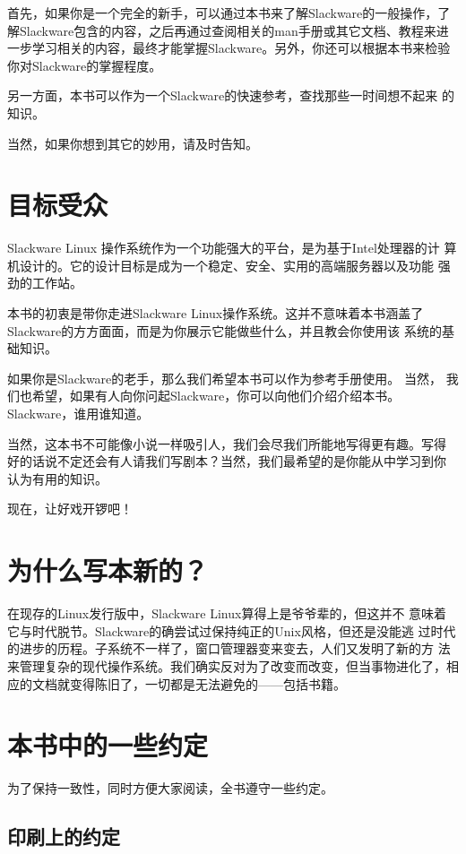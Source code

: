 首先，如果你是一个完全的新手，可以通过本书来了解Slackware的一般操作，了
解Slackware包含的内容，之后再通过查阅相关的man手册或其它文档、教程来进
一步学习相关的内容，最终才能掌握Slackware。另外，你还可以根据本书来检验
你对Slackware的掌握程度。

另一方面，本书可以作为一个Slackware的快速参考，查找那些一时间想不起来
的知识。

当然，如果你想到其它的妙用，请及时告知。


\section*{目标受众}
\label{sec:preface:intendedAudience}
Slackware Linux 操作系统作为一个功能强大的平台，是为基于Intel处理器的计
算机设计的。它的设计目标是成为一个稳定、安全、实用的高端服务器以及功能
强劲的工作站。

本书的初衷是带你走进Slackware Linux操作系统。这并不意味着本书涵盖了
Slackware的方方面面，而是为你展示它能做些什么，并且教会你使用该
系统的基础知识。

如果你是Slackware的老手，那么我们希望本书可以作为参考手册使用。 当然，
我们也希望，如果有人向你问起Slackware，你可以向他们介绍介绍本书。
Slackware，谁用谁知道。

当然，这本书不可能像小说一样吸引人，我们会尽我们所能地写得更有趣。写得
好的话说不定还会有人请我们写剧本？当然，我们最希望的是你能从中学习到你
认为有用的知识。

现在，让好戏开锣吧！

\section*{为什么写本新的？}
\label{sec:preface:whyANewSlackwareBook}
在现存的Linux发行版中，Slackware Linux算得上是爷爷辈的，但这并不
意味着它与时代脱节。Slackware的确尝试过保持纯正的Unix风格，但还是没能逃
过时代的进步的历程。子系统不一样了，窗口管理器变来变去，人们又发明了新的方
法来管理复杂的现代操作系统。我们确实反对为了改变而改变，但当事物进化了，相
应的文档就变得陈旧了，一切都是无法避免的——包括书籍。


\section*{本书中的一些约定}
\label{sec:preface:conventionsUsedInThisBook}

为了保持一致性，同时方便大家阅读，全书遵守一些约定。

\subsection*{印刷上的约定}
\label{sec:preface:conventions:typographic}

